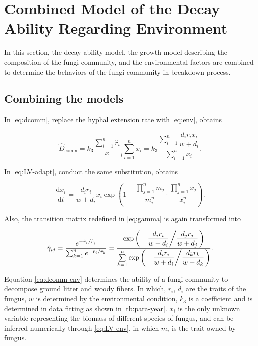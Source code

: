 \section{Combined Model of the Decay Ability Regarding Environment}\label{sec:com}

In this section, the decay ability model, the growth model describing the composition of the fungi community, and the environmental factors are combined to determine the behaviors of the fungi community in breakdown process.

\subsection{Combining the models}

In \eqref{eq:dcomm}, replace the hyphal extension rate with \eqref{eq:env}, obtains

\begin{equation}\label{eq:dcomm-env}
\hat{D}_\text{comm} =
    k_3\frac{\sum_{i=1}^n \hat{r}_i}x_i{\sum_{i=1}^n x_i} =
    k_3\dfrac{\sum\limits_{i=1}^n \dfrac{d_ir_ix_i}
    {w + d_i}}{\sum\limits_{i=1}^n x_i}.
\end{equation}

In \eqref{eq:LV-adapt}, conduct the same substitution, obtains

\begin{equation}\label{eq:LV-env}
    \frac{\mathrm{d}x_i}{\mathrm{d}t} =
    \frac{d_ir_i}{w + d_i}x_i\exp\left(
            1 - \frac{\prod_{j=1}^n m_j}{m_i^n}\cdot
            \frac{\prod_{j=1}^n x_j}{x_i^n}
        \right).
\end{equation}

Also, the transition matrix redefined in \eqref{eq:gamma} is again transformed into

\begin{equation}\label{eq:markov-env}
    \hat{\gamma}_{ij} =
    \frac{e^{- \hat{r}_i / \hat{r}_j}}{\sum_{k=1}^n e^{- \hat{r}_i / \hat{r}_k}} =
    \frac{\exp\left(
        -\left.\dfrac{d_ir_i}{w + d_i} \middle/ \dfrac{d_jr_j}{w + d_j}\right.
        \right)}
    {\sum\limits_{k=1}^n\exp\left(
        -\left.\dfrac{d_ir_i}{w + d_i} \middle/ \dfrac{d_kr_k}{w + d_k}\right.
        \right)}.
\end{equation}

Equation \eqref{eq:dcomm-env} determines the ability of a fungi community to decompose ground litter and woody fibers. In which, $r_i$, $d_i$ are the traits of the fungus, $w$ is determined by the environmental condition, $k_3$ is a coefficient and is determined in data fitting as shown in \ref{tb:para-year}. $x_i$ is the only unknown variable representing the biomass of different species of fungus, and can be inferred numerically through \eqref{eq:LV-env}, in which $m_i$ is the trait owned by fungus.



